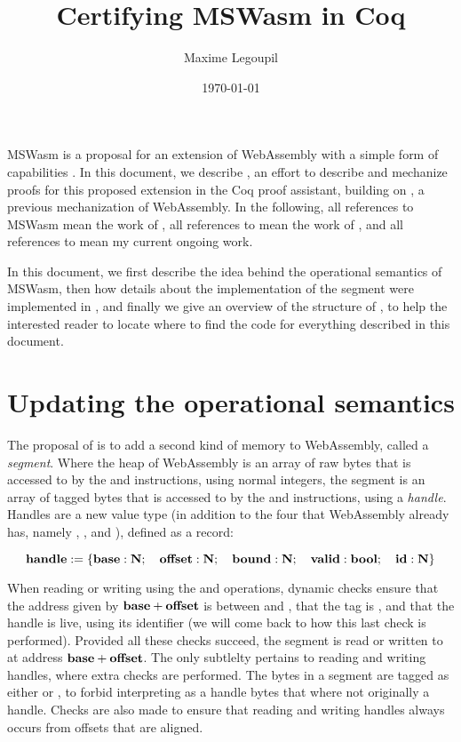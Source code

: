 \documentclass[a4paper]{article}
\author{Maxime Legoupil}
\title{Certifying MSWasm in Coq}
\date{\today}
\begin{document}
\maketitle

MSWasm \cite{mswasm} is a proposal for an extension of WebAssembly \cite{wasm} with
a simple form of capabilities \cite{capabilities}. In this document, we describe \irismswasm,
an effort to describe and mechanize proofs for this proposed extension in the Coq proof assistant,
building on \iriswasm \cite{iriswasm}, a previous mechanization of WebAssembly. In the following, all references to MSWasm mean the work of \citet{mswasm}, all references to \iriswasm mean the work of \citet{iriswasm}, and all references to \irismswasm mean my current ongoing work.

In this document, we first describe the idea behind the operational semantics of MSWasm, then how details about the implementation of the segment were implemented in \irismswasm, and finally we give an overview of the structure of \irismswasm, to help the interested reader to locate where to find the code for everything described in this document.

\section{Updating the operational semantics}

The proposal of \citet{mswasm} is to add a second kind of memory to WebAssembly, called
a \emph{segment}. Where the heap of WebAssembly is an array of raw bytes that is accessed to by
the \xxWload and \xxWstore instructions, using normal \xxWithirtytwo integers, the segment
is an array of tagged bytes that is accessed to by the \xxWsegload and \xxWsegstore instructions,
using a \emph{handle}. Handles are a new value type (in addition to the four that WebAssembly
already has, namely \xxWithirtytwo, \xxWisixtyfour, \xxWfthirtytwo and \xxWfsixtyfour),
defined as a record:

\[ \mathbf{handle} := \{ \mathbf{base} : \mathbf{N}; \quad \mathbf{offset} : \mathbf{N};\quad \mathbf{bound} : \mathbf{N};\quad \mathbf{valid} : \mathbf{bool};\quad \mathbf{id} : \mathbf{N} \} \]

When reading or writing using the \xxWsegload and \xxWsegstore operations, dynamic checks ensure that the address given by \( \mathbf{base} + \mathbf{offset} \) is between \xxWbase and \xxWbound, that the \xxWvalid tag is \xxCtrue, and that the handle is live, using its identifier \xxWid (we will come back to how this last check is performed).
Provided all these checks succeed, the segment is read or written to at address \( \mathbf{base} + \mathbf{offset} \). The only subtlelty pertains to reading and writing handles, where extra checks are performed. The bytes in a segment are tagged as either \xxWNumeric or \xxWHandle, to forbid interpreting as a handle bytes that where not originally a handle. Checks are also made to ensure that reading and writing handles always occurs from offsets that are aligned.
\end{document}
